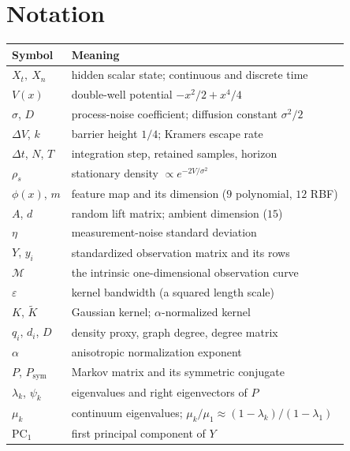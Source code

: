 \documentclass[11pt]{article}
\newcommand{\eps}{\varepsilon}
\newcommand{\Kt}{\widetilde{K}}
\begin{document}



\appendix
\newpage

\section{Notation}
\label{app:notation}

\begin{center}
\begin{tabular}{@{}ll@{}}
\toprule
Symbol & Meaning \\
\midrule
$X_t,\ X_n$ & hidden scalar state; continuous and discrete time \\
$V(x)$ & double-well potential $-x^2/2 + x^4/4$ \\
$\sigma$, $D$ & process-noise coefficient; diffusion constant $\sigma^2/2$ \\
$\Delta V$, $k$ & barrier height $1/4$; Kramers escape rate \\
$\Delta t$, $N$, $T$ & integration step, retained samples, horizon \\
$\rho_s$ & stationary density $\propto e^{-2V/\sigma^2}$ \\
$\phi(x)$, $m$ & feature map and its dimension ($9$ polynomial, $12$ RBF) \\
$A$, $d$ & random lift matrix; ambient dimension ($15$) \\
$\eta$ & measurement-noise standard deviation \\
$Y$, $y_i$ & standardized observation matrix and its rows \\
$\mathcal{M}$ & the intrinsic one-dimensional observation curve \\
$\eps$ & kernel bandwidth (a squared length scale) \\
$K$, $\Kt$ & Gaussian kernel; $\alpha$-normalized kernel \\
$q_i$, $d_i$, $D$ & density proxy, graph degree, degree matrix \\
$\alpha$ & anisotropic normalization exponent \\
$P$, $P_{\mathrm{sym}}$ & Markov matrix and its symmetric conjugate \\
$\lambda_k$, $\psi_k$ & eigenvalues and right eigenvectors of $P$ \\
$\mu_k$ & continuum eigenvalues; $\mu_k/\mu_1 \approx
          (1-\lambda_k)/(1-\lambda_1)$ \\
$\mathrm{PC}_1$ & first principal component of $Y$ \\
\bottomrule
\end{tabular}
\end{center}
\end{document}
